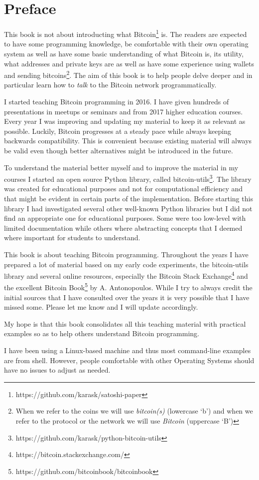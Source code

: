 
\section{Preface}
This book is not about introducting what Bitcoin\footnote{https://github.com/karask/satoshi-paper} is. The readers are expected to have some programming knowledge, be comfortable with their own operating system as well as have some basic understanding of what Bitcoin is, its utility, what addresses and private keys are as well as have some experience using wallets and sending bitcoins\footnote{When we refer to the coins we will use \emph{bitcoin(s)} (lowercase `b') and when we refer to the protocol or the network we will use \emph{Bitcoin} (uppercase `B')}. The aim of this book is to help people delve deeper and in particular learn how to \emph{talk} to the Bitcoin network programmatically.

I started teaching Bitcoin programming in 2016. I have given hundreds of presentations in meetups or seminars and from 2017 higher education courses. Every year I was improving and updating my material to keep it as relevant as possible. Luckily, Bitcoin progresses at a steady pace while always keeping backwards compatibility. This is convenient because existing material will always be valid even though better alternatives might be introduced in the future.
  
To understand the material better myself and to improve the material in my courses I started an open source Python library, called bitcoin-utils\footnote{https://github.com/karask/python-bitcoin-utils}. The library was created for educational purposes and not for computational efficiency and that might be evident in certain parts of the implementation. Before starting this library I had investigated several other well-known Python libraries but I did not find an appropriate one for educational purposes. Some were too low-level with limited documentation while others where abstracting concepts that I deemed where important for students to understand.

This book is about teaching Bitcoin programming. Throughout the years I have prepared a lot of material based on my early code experiments, the bitcoin-utils library and several online resources, especially the Bitcoin Stack Exchange\footnote{https://bitcoin.stackexchange.com/} and the excellent Bitcoin Book\footnote{https://github.com/bitcoinbook/bitcoinbook} by A. Antonopoulos. While I try to always credit the initial sources that I have consulted over the years it is very possible that I have missed some. Please let me know and I will update accordingly.

My hope is that this book consolidates all this teaching material with practical examples so as to help others understand Bitcoin programming. 

I have been using a Linux-based machine and thus most command-line examples are from  shell. However, people comfortable with other Operating Systems should have no issues to adjust as needed.
